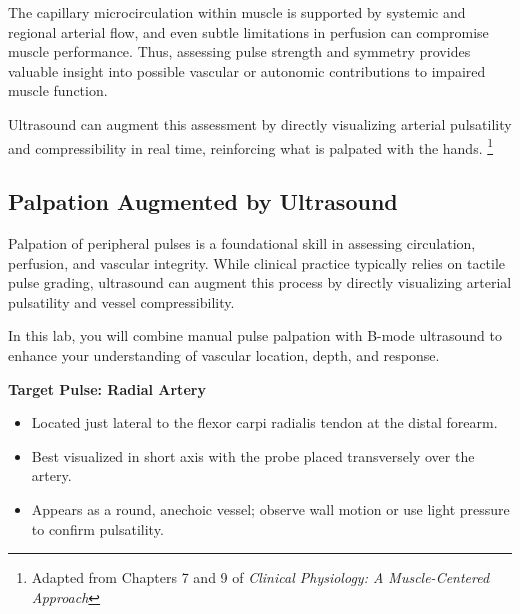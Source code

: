 The capillary microcirculation within muscle is supported by systemic and regional arterial flow, and even subtle limitations in perfusion can compromise muscle performance. Thus, assessing pulse strength and symmetry provides valuable insight into possible vascular or autonomic contributions to impaired muscle function.

Ultrasound can augment this assessment by directly visualizing arterial pulsatility and compressibility in real time, reinforcing what is palpated with the hands. \footnote{Adapted from Chapters 7 and 9 of \textit{Clinical Physiology: A Muscle-Centered Approach}}

\subsection*{Palpation Augmented by Ultrasound}

Palpation of peripheral pulses is a foundational skill in assessing circulation, perfusion, and vascular integrity. While clinical practice typically relies on tactile pulse grading, ultrasound can augment this process by directly visualizing arterial pulsatility and vessel compressibility.

In this lab, you will combine manual pulse palpation with B-mode ultrasound to enhance your understanding of vascular location, depth, and response.

\textbf{Target Pulse: Radial Artery}
\begin{itemize}
  \item Located just lateral to the flexor carpi radialis tendon at the distal forearm.
  \item Best visualized in short axis with the probe placed transversely over the artery.
  \item Appears as a round, anechoic vessel; observe wall motion or use light pressure to confirm pulsatility.
\end{itemize}

